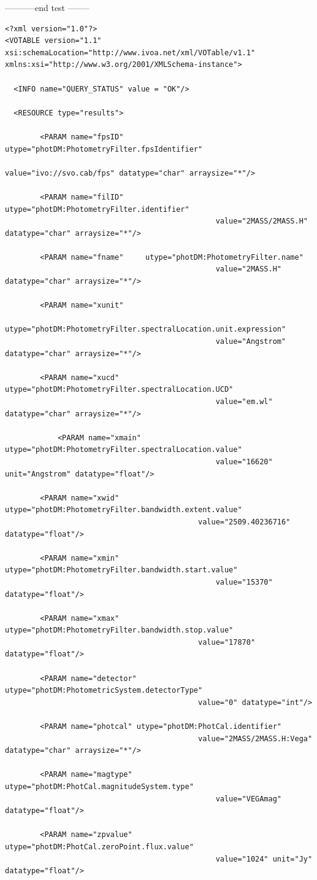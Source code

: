 \documentclass[11pt,a4paper]{ivoa}
\begin{document}
\begin{appendices}
-----------end test --------
\begin{verbatim}
<?xml version="1.0"?>
<VOTABLE version="1.1" xsi:schemaLocation="http://www.ivoa.net/xml/VOTable/v1.1"
xmlns:xsi="http://www.w3.org/2001/XMLSchema-instance">

  <INFO name="QUERY_STATUS" value = "OK"/>

  <RESOURCE type="results">

        <PARAM name="fpsID" 	utype="photDM:PhotometryFilter.fpsIdentifier"
        										value="ivo://svo.cab/fps" datatype="char" arraysize="*"/>

        <PARAM name="filID" 	utype="photDM:PhotometryFilter.identifier"
        										value="2MASS/2MASS.H" datatype="char" arraysize="*"/>

        <PARAM name="fname" 	utype="photDM:PhotometryFilter.name"
        										value="2MASS.H" datatype="char" arraysize="*"/>

        <PARAM name="xunit"
        	utype="photDM:PhotometryFilter.spectralLocation.unit.expression"
        										value="Angstrom" datatype="char" arraysize="*"/>

        <PARAM name="xucd"  	utype="photDM:PhotometryFilter.spectralLocation.UCD"
        										value="em.wl" datatype="char" arraysize="*"/>

    		<PARAM name="xmain" 	utype="photDM:PhotometryFilter.spectralLocation.value"
    											value="16620" unit="Angstrom" datatype="float"/>

		<PARAM name="xwid"	utype="photDM:PhotometryFilter.bandwidth.extent.value"
											value="2509.40236716" datatype="float"/>

        <PARAM name="xmin"  utype="photDM:PhotometryFilter.bandwidth.start.value"
        										value="15370" datatype="float"/>

   		<PARAM name="xmax"  utype="photDM:PhotometryFilter.bandwidth.stop.value"
   											value="17870" datatype="float"/>

		<PARAM name="detector" utype="photDM:PhotometricSystem.detectorType"
											value="0" datatype="int"/>

		<PARAM name="photcal" utype="photDM:PhotCal.identifier"
											value="2MASS/2MASS.H:Vega" datatype="char" arraysize="*"/>

        <PARAM name="magtype" utype="photDM:PhotCal.magnitudeSystem.type"
        										value="VEGAmag" datatype="float"/>

        <PARAM name="zpvalue" utype="photDM:PhotCal.zeroPoint.flux.value"
        										value="1024" unit="Jy" datatype="float"/>


\end{verbatim}
\end{appendices}
\end{document}
